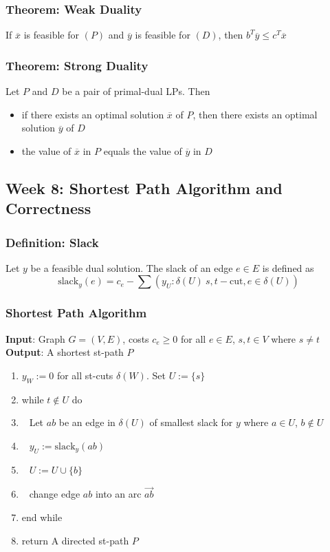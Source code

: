 \documentclass[11pt]{article}
\begin{document}
\subsubsection{Theorem: Weak Duality}
If $\overline{x}$ is feasible for $(P)$ and $\overline{y}$ is feasible for $(D)$, then $b^T\overline{y}\leq c^T\overline{x}$
\subsubsection{Theorem: Strong Duality}
Let $P$ and $D$ be a pair of primal-dual LPs. Then 
\begin{itemize}
  \item if there exists an optimal solution $\overline{x}$ of $P$, then there exists an optimal solution $\overline{y}$ of $D$
  \item the value of $\overline{x}$ in $P$ equals the value of $\overline{y}$ in $D$
\end{itemize}
\subsection{Week 8: Shortest Path Algorithm and Correctness}
\subsubsection{Definition: Slack}
Let $y$ be a feasible dual solution. The slack of an edge $e\in E$ is defined as 
\[\text{slack}_y(e) = c_e-\sum(y_U: \delta(U)\ s,t-\text{cut}, e\in\delta(U))\]
\subsubsection{Shortest Path Algorithm}
\textbf{Input}: Graph $G = (V,E)$, costs $c_e\geq0$ for all $e\in E$, $s,t\in V$ where $s\neq t$\\ 
\textbf{Output}: A shortest st-path $P$
\begin{enumerate}
  \item $y_W:=0$ for all st-cuts $\delta(W)$. Set $U:=\{s\}$
  \item while $t\notin U$ do 
  \item $\ \ $ Let $ab$ be an edge in $\delta(U)$ of smallest slack for $y$ where $a\in U$, $b\notin U$
  \item $\ \ $ $y_U:=\text{slack}_y(ab)$
  \item $\ \ $ $U:= U\cup\{b\}$
  \item $\ \ $ change edge $ab$ into an arc $\overrightarrow{ab}$
  \item end while 
  \item return A directed st-path $P$
\end{enumerate}
\end{document}
